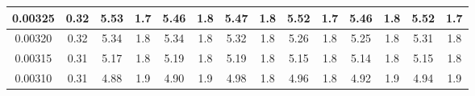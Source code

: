\begin{table}[H]
{\begin{tabular}{|c|c|cccccccccccc|}
0.00325                                            & 0.32                                                                  & \multicolumn{1}{c|}{5.53}    & \multicolumn{1}{c|}{1.7}                                & \multicolumn{1}{c|}{5.46}      & \multicolumn{1}{c|}{1.8}                                & \multicolumn{1}{c|}{5.47}      & \multicolumn{1}{c|}{1.8}                                & \multicolumn{1}{c|}{5.52}      & \multicolumn{1}{c|}{1.7}                                & \multicolumn{1}{c|}{5.46}      & \multicolumn{1}{c|}{1.8}                                & \multicolumn{1}{c|}{5.52}      & 1.7                                \\ \hline
0.00320                                            & 0.32                                                                  & \multicolumn{1}{c|}{5.34}    & \multicolumn{1}{c|}{1.8}                                & \multicolumn{1}{c|}{5.34}      & \multicolumn{1}{c|}{1.8}                                & \multicolumn{1}{c|}{5.32}      & \multicolumn{1}{c|}{1.8}                                & \multicolumn{1}{c|}{5.26}      & \multicolumn{1}{c|}{1.8}                                & \multicolumn{1}{c|}{5.25}      & \multicolumn{1}{c|}{1.8}                                & \multicolumn{1}{c|}{5.31}      & 1.8                                \\ \hline
0.00315                                            & 0.31                                                                  & \multicolumn{1}{c|}{5.17}    & \multicolumn{1}{c|}{1.8}                                & \multicolumn{1}{c|}{5.19}      & \multicolumn{1}{c|}{1.8}                                & \multicolumn{1}{c|}{5.19}      & \multicolumn{1}{c|}{1.8}                                & \multicolumn{1}{c|}{5.15}      & \multicolumn{1}{c|}{1.8}                                & \multicolumn{1}{c|}{5.14}      & \multicolumn{1}{c|}{1.8}                                & \multicolumn{1}{c|}{5.15}      & 1.8                                \\ \hline
0.00310                                            & 0.31                                                                  & \multicolumn{1}{c|}{4.88}    & \multicolumn{1}{c|}{1.9}                                & \multicolumn{1}{c|}{4.90}      & \multicolumn{1}{c|}{1.9}                                & \multicolumn{1}{c|}{4.98}      & \multicolumn{1}{c|}{1.8}                                & \multicolumn{1}{c|}{4.96}      & \multicolumn{1}{c|}{1.8}                                & \multicolumn{1}{c|}{4.92}      & \multicolumn{1}{c|}{1.9}                                & \multicolumn{1}{c|}{4.94}      & 1.9                                \\ \hline

\end{tabular}}
\end{table}
